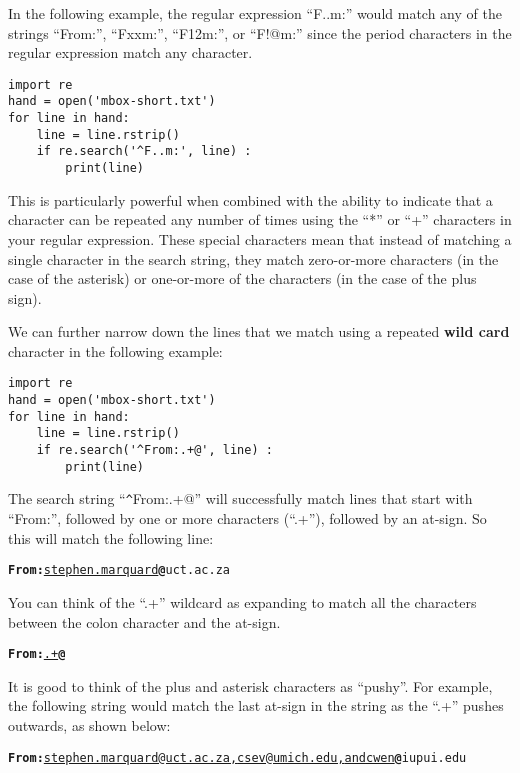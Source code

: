 In the following example, the regular expression ``F..m:'' would match any of the strings
``From:'', ``Fxxm:'', ``F12m:'', or ``F!@m:'' since the period characters in the regular
expression match any character.

\beforeverb
\begin{verbatim}
import re
hand = open('mbox-short.txt')
for line in hand:
    line = line.rstrip()
    if re.search('^F..m:', line) :
        print(line)
\end{verbatim}
\afterverb
%
This is particularly powerful when combined with the ability to indicate that a character can
be repeated any number of times using the ``*'' or ``+'' characters in your regular expression.
These special characters mean that instead of matching a single character in the search string,
they match zero-or-more characters (in the case of the asterisk) or one-or-more of the characters
(in the case of the plus sign).

We can further narrow down the lines that we match using a repeated {\bf wild card} character in
the following example:

\beforeverb
\begin{verbatim}
import re
hand = open('mbox-short.txt')
for line in hand:
    line = line.rstrip()
    if re.search('^From:.+@', line) :
        print(line)
\end{verbatim}
\afterverb
%
The search string ``\verb"^"From:.+@'' will successfully match lines that start with ``From:'',
followed by one or more characters (``.+''), followed by an at-sign.  So this will match the
following line:

\beforeverb
\begin{alltt}
{\bf From:}\underline{ stephen.marquard}{\bf @}uct.ac.za
\end{alltt}
\afterverb

You can think of the ``.+'' wildcard as expanding to match all the characters between the 
colon character and the at-sign.  

\beforeverb
\begin{alltt}
{\bf From:}\underline{.+}{\bf @}
\end{alltt}
\afterverb

It is good to think of the plus and asterisk characters as ``pushy''.  For example, the following
string would match the last at-sign in the string as the ``.+'' pushes outwards, as shown below:

\beforeverb
\begin{alltt}
{\bf From:}\underline{ stephen.marquard@uct.ac.za, csev@umich.edu, and cwen}{\bf @}iupui.edu
\end{alltt}
\afterverb

